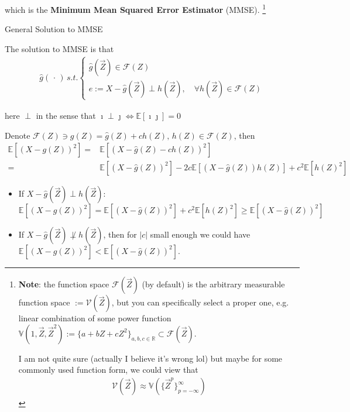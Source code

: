     which is the \textbf{Minimum Mean Squared Error Estimator} (MMSE). \footnote{\textbf{Note}: the function space $ \mathscr{F}(\vec{Z}) $ (by default) is the arbitrary measurable function space $ :=\mathscr{V}(\vec{Z}) $, but you can specifically select a proper one, e.g. linear combination of some power function $ \mathbb{V}(1,\vec{Z},\vec{Z}^2):=\{a+bZ+cZ^2\}_{a,b,c\in\mathbb{R}}\subset \mathscr{F}(\vec{Z}) $.
    
    I am not quite sure (actually I believe it's wrong lol) but maybe for some commonly used function form, we could view that
    \begin{align}
        \mathscr{V}(\vec{Z})\approx \mathbb{V}(\{\vec{Z}^p\}_{p=-\infty}^\infty) 
    \end{align}
    
    }

\begin{point}
    General Solution to MMSE
\end{point}

    The solution to MMSE is that
    \begin{align}
         \hat{g}(\, \cdot \, )\, s.t. \begin{cases}
            \hat{g}(\vec{Z})\in \mathscr{F}(Z)\\
            e:=X-\hat{g}(\vec{Z})\perp h(\vec{Z}),\quad \forall h(\vec{Z})\in\mathscr{F}(Z)
         \end{cases}
    \end{align}
    
    here $ \perp $ in the sense that $ \imath \perp \jmath \Leftrightarrow \mathbb{E}\left[ \imath\jmath \right]=0  $
    
        Denote $ \mathscr{F}(Z)\ni g(Z)=\hat{g}(Z)+c h(Z)  ,\,h(Z)\in\mathscr{F}(Z)$, then
        \begin{align}
            \mathbb{E}\left[ (X-g(Z))^2 \right]  =&\mathbb{E}\left[ (X-\hat{g}(Z)-ch(Z))^2 \right]\\
            =&\mathbb{E}\left[ (X-\hat{g}(Z))^2 \right] -2c\mathbb{E}\left[ (X-\hat{g}(Z))h(Z) \right]+c^2\mathbb{E}\left[ h(Z)^2 \right]  
        \end{align}
        
        \begin{itemize}[topsep=2pt,itemsep=0pt]
            \item If $ X-\hat{g}(\vec{Z})\perp h(\vec{Z})  $: $
                \mathbb{E}\left[ (X-g(Z))^2 \right]  =\mathbb{E}\left[ (X-\hat{g}(Z))^2 \right] +c^2\mathbb{E}\left[ h(Z)^2 \right]  \geq \mathbb{E}\left[ (X-\hat{g}(Z))^2 \right]$
            \item If $ X-\hat{g}(\vec{Z})\not\perp h(\vec{Z})  $, then for $ |c| $ small enough we could have $ \mathbb{E}\left[ (X-g(Z))^2 \right]< \mathbb{E}\left[ (X-\hat{g}(Z))^2 \right]$.          
        \end{itemize}
        
